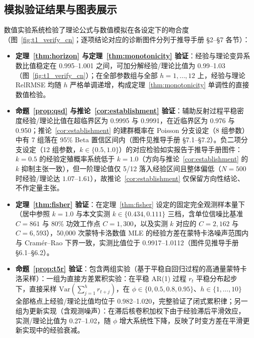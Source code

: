 \documentclass[11pt,a4paper]{article}
\theoremstyle{plain}
\theoremstyle{definition}
\begin{document}
\subsection{模拟验证结果与图表展示}

数值实验系统检验了理论公式与数值模拟在各设定下的吻合度（图~\ref{fig:t1_verify_cn}；逐项结论对应的诊断图件分列于推导手册 §2--§7 各节）：
\begin{itemize}
\item \textbf{定理~\ref{thm:horizon} 与定理~\ref{thm:monotonicity} 验证}：经验与理论变异系数比值稳定在 0.995--1.001 之间，可加分解经验/理论比值为 0.99--1.03（图~\ref{fig:t1_verify_cn}）；在全部参数组与全部 $h=1,\dots,12$ 上，经验与理论 RelRMSE 均随 $h$ 严格单调递增，构成定理~\ref{thm:monotonicity} 单调性的直接数值检验。
\item \textbf{命题~\ref{prop:qsd} 与推论~\ref{cor:establishment} 验证}：辅助反射过程平稳密度经验/理论比值在超临界区为 0.9995 与 0.9991，在近临界区为 0.976 与 0.950；推论~\ref{cor:establishment} 的建群概率在 Poisson 分支设定（8 组参数）中有 7 组落在 95\% Beta 置信区间内（图件见推导手册 §7.1--§7.2）。负二项分支设定（12 组参数，$k \in \{0.5, 1.0\}$）的对应检验如实报告于推导手册图件：$k=0.5$ 的经验定殖概率系统低于 $k=1.0$（方向与推论~\ref{cor:establishment} 的 $k$ 抑制主张一致），但一阶理论值仅 5/12 落入经验区间且整体偏低（$N=500$ 时经验/理论达 $1.07\text{--}1.61$），故推论~\ref{cor:establishment} 仅保留方向性结论、不作定量主张。
\item \textbf{定理~\ref{thm:fisher} 验证}：在定理~\ref{thm:fisher} 设定的固定完全观测样本量下（居中参照 $k=1.0$ 与本文实测 $k\in\{0.434,0.111\}$ 三档，含单位信噪比基准 $C=861$ 与 80\% 功效工作点 $C=1{,}300$，以及实测 $k$ 对应的 $C=2{,}162$ 与 $C=6{,}593$），50,000 次蒙特卡洛数值 MLE 的经验方差在蒙特卡洛噪声范围内与 Cramér--Rao 下界一致，实测比值位于 0.9917--1.0112（图件见推导手册 §6.1--§6.2）。
\item \textbf{命题~\ref{prop:t5r} 验证}：包含两组实验（基于平稳自回归过程的高通量蒙特卡洛采样）：一组为直接方差累积实验：在平稳 AR(1) 过程 $r_t$ 平稳分布起步下，直接采样 $\text{Var}(\sum_{j=1}^h r_{t+j})$，在 $\phi \in \{0, 0.5, 0.8, 0.95\}$、$h \in \{1, \dots, 10\}$ 全部格点上经验/理论比值均位于 0.982--1.020，完整验证了闭式累积律；另一组为更新实现（含观测噪声）：在滞后核卷积加权下由于经验滞后平滑效应，实测/理论比值为 0.27--1.02，随 $\phi$ 增大系统性下降，反映了时变方差在平滑更新实现中的经验衰减。
\end{itemize}
\end{document}
